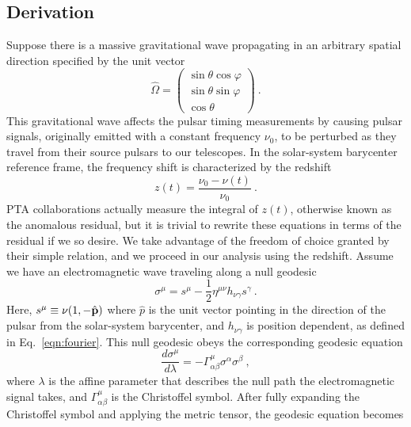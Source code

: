\documentclass[prd,aps,psfig,nofootinbib,nobibnotes,superscriptaddress,preprintnumbers,times]{revtex4-2}\setlength{\topmargin}{-14mm}
\begin{document}
\subsection{Derivation}\label{subsec:derivation}
Suppose there is a massive gravitational wave propagating in an arbitrary spatial direction specified by the unit vector
\begin{equation}\label{eqn:omega}
    \hat{\Omega} = \begin{pmatrix}
                        \sin\theta \cos\varphi \\
                        \sin\theta \sin\varphi \\
                        \cos\theta
                    \end{pmatrix} \ .
\end{equation}
This gravitational wave affects the pulsar timing measurements by causing pulsar signals, originally emitted with a constant frequency $\nu_0$, to be perturbed as they travel from their source pulsars to our telescopes. 
In the solar-system barycenter reference frame, the frequency shift is characterized by the redshift
\begin{equation}\label{eqn:z}
    z(t) = \frac{\nu_0 - \nu(t)}{\nu_0} \ .
\end{equation}
PTA collaborations actually measure the integral of $z(t)$, otherwise known as the anomalous residual, but it is trivial to rewrite these equations in terms of the residual if we so desire. We take advantage of the freedom of choice granted by their simple relation, and we proceed in our analysis using the redshift. Assume we have an electromagnetic wave traveling along a null geodesic 
\begin{equation}\label{eqn:null}
    \sigma^\mu = s^\mu - \frac{1}{2} \eta^{\mu\nu}h_{\nu \gamma}s^\gamma \ .
\end{equation}
Here, $s^\mu \equiv \nu (1, -\hat{\bf p})$ where $\hat{p}$ is the unit vector pointing in the direction of the pulsar from the solar-system barycenter, and $h_{\nu \gamma}$ is position dependent, as defined in Eq.\ \ref{eqn:fourier}. This null geodesic obeys the corresponding geodesic equation 
\begin{equation}\label{eqn:geodesic}
    \frac{d\sigma^\mu}{d\lambda} = -\Gamma_{\alpha \beta}^\mu \sigma^\alpha \sigma^\beta \ ,
\end{equation} where $\lambda$ is the affine parameter that describes the null path the electromagnetic signal takes, and $\Gamma_{\alpha \beta}^\mu$ is the Christoffel symbol. After fully expanding the Christoffel symbol and applying the metric tensor, the geodesic equation becomes  
\end{document}
